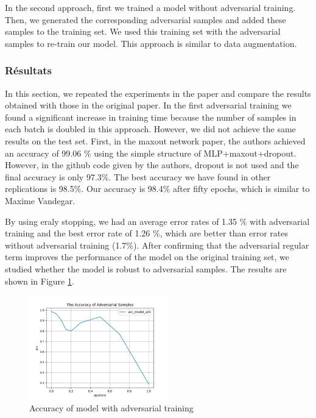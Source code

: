 In the second approach, first we trained a model without adversarial training. Then, we generated the corresponding adversarial samples and added these samples to the training set. We used this training set with the adversarial samples to re-train our model. This approach is similar to data augmentation. 



\subsubsection{Résultats}
In this section, we repeated the experiments in the paper and compare the results obtained with those in the original paper. In the first adversarial training we found a significant increase in training time because the number of samples in each batch is doubled in this approach. However, we did not achieve the same results on the test set. First, in the maxout network paper\citep{pmlr-v28-goodfellow13}, the authors achieved an accuracy of 99.06 $\%$ using the simple structure of MLP+maxout+dropout. However, in the github code given by the authors, dropout is not used and the final accuracy is only 97.3$\%$. The best accuracy we have found in other replications is 98.5$\%$. Our accuracy is 98.4$\%$ after fifty epochs, which is similar to Maxime Vandegar.

By using eraly stopping, we had an average error rates of 1.35 $\%$ with adversarial training and the best error rate of 1.26 $\%$, which are better than error rates without adversarial training (1.7$\%$). After confirming that the adversarial regular term improves the performance of the model on the original training set, we studied whether the model is robust to adversarial samples. The results are shown in Figure \ref{acc_advtraining_2}.

\begin{figure}[htbp]
\centering
\includegraphics[width=6cm]{acc_advtraining_2.png}
\caption{Accuracy of model with adversarial training}
\label{acc_advtraining_2}
\end{figure} 

